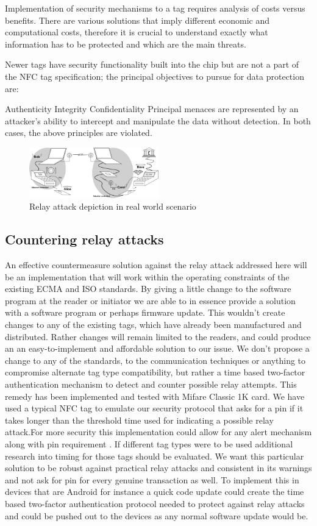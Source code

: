 \documentclass[conference]{IEEEtran}
\begin{document}
Implementation of security mechanisms to a tag requires analysis of costs versus benefits. There are various solutions that imply different economic and computational costs, therefore it is crucial to understand exactly what information has to be protected and which are the main threats.

Newer tags have security functionality built into the chip but are not a part of the NFC tag specification; the principal objectives to pursue for data protection are:

Authenticity
Integrity
Confidentiality
Principal menaces are represented by an attacker’s ability to intercept and manipulate the data without detection. In both cases, the above principles are violated.
\begin{figure}[h]
\includegraphics[width=0.5\textwidth]{sc-relay}
\caption{Relay attack depiction in real world scenario}
\end{figure}

\subsection{Countering relay attacks}
An effective countermeasure solution against the relay attack addressed here will be
an implementation that will work within the operating constraints of the existing ECMA and ISO standards. By giving a little change to the software program at the reader or
initiator we are able to in essence provide a solution with a software program or perhaps firmware update.
This wouldn't create changes to any of the existing tags, which have already been manufactured and distributed. Rather changes will remain limited to the readers,
and could produce an an easy-to-implement and affordable solution to our issue. We
don't propose a change to any of the standards, to the communication techniques or
anything to compromise alternate tag type compatibility, but rather a time based two-factor authentication mechanism to detect and counter possible relay attempts.
This remedy has been implemented and tested with Mifare Classic 1K card. We have used a typical NFC tag to emulate our security protocol that asks for a pin if it takes longer than the threshold time used for indicating a possible relay attack.For more security this implementation could allow for any alert mechanism along with pin requirement .
If different tag types were to be used additional research
into timing for those tags should be evaluated. We want this particular solution to be robust
against practical relay attacks and consistent in its warnings and not ask for pin for every genuine transaction as well. To implement this in devices that are Android for instance a
quick code update could create the time based two-factor authentication protocol needed to protect against relay attacks and could be pushed out to the devices as any normal software update would be.
\end{document}
